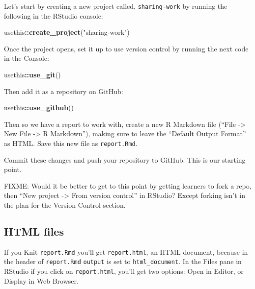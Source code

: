 \documentclass[]{Nemilov}
\newenvironment{Shaded}{\begin{snugshade}}{\end{snugshade}}
\newcommand{\KeywordTok}[1]{\textcolor[rgb]{0.13,0.29,0.53}{\textbf{#1}}}
\newcommand{\NormalTok}[1]{#1}
\newcommand{\OperatorTok}[1]{\textcolor[rgb]{0.81,0.36,0.00}{\textbf{#1}}}
\newcommand{\StringTok}[1]{\textcolor[rgb]{0.31,0.60,0.02}{#1}}
\begin{document}
Let's start by creating a new project called, \texttt{sharing-work} by running the following in the RStudio console:

\begin{Shaded}
\begin{Highlighting}[]
\NormalTok{usethis}\OperatorTok{::}\KeywordTok{create_project}\NormalTok{(}\StringTok{"sharing-work"}\NormalTok{)}
\end{Highlighting}
\end{Shaded}

Once the project opens, set it up to use version control by running the next code in the Console:

\begin{Shaded}
\begin{Highlighting}[]
\NormalTok{usethis}\OperatorTok{::}\KeywordTok{use_git}\NormalTok{()}
\end{Highlighting}
\end{Shaded}

Then add it as a repository on GitHub:

\begin{Shaded}
\begin{Highlighting}[]
\NormalTok{usethis}\OperatorTok{::}\KeywordTok{use_github}\NormalTok{()}
\end{Highlighting}
\end{Shaded}

Then so we have a report to work with, create a new R Markdown file (``File -\textgreater{} New File -\textgreater{} R Markdown''), making sure to leave the ``Default Output Format'' as HTML. Save this new file as \texttt{report.Rmd}.

Commit these changes and push your repository to GitHub. This is our starting point.

FIXME: Would it be better to get to this point by getting learners to fork a repo, then ``New project -\textgreater{} From version control'' in RStudio? Except forking isn't in the plan for the Version Control section.

\hypertarget{html-files}{%
\subsection{HTML files}\label{html-files}}

If you Knit \texttt{report.Rmd} you'll get \texttt{report.html}, an HTML document, because in the header of \texttt{report.Rmd} \texttt{output} is set to \texttt{html\_document}. In the Files pane in RStudio if you click on \texttt{report.html}, you'll get two options: Open in Editor, or Display in Web Browser.
\end{document}
